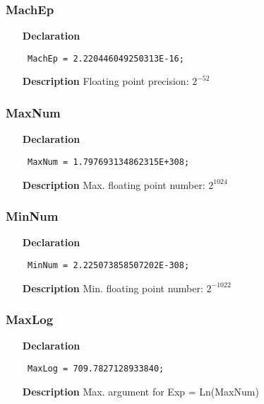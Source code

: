 \documentclass[12pt,a4paper,oneside]{report}
\newcommand{\declarationitem}[1]{\textbf{#1}}
\newcommand{\descriptiontitle}[1]{\textbf{#1}}
\newcommand{\code}[1]{\texttt{#1}}
\begin{document}
\subsubsection{MachEp}
\label{utypes-MachEp}
\begin{itemize}\item[\declarationitem{Declaration}\hfill]
	\begin{flushleft}
		\code{
			MachEp   = 2.220446049250313E-16;}
		
	\end{flushleft}
	
	\par
	\item[\descriptiontitle{Description}]
	Floating point precision: $2^{-52}$
\end{itemize}
\subsubsection{MaxNum}
\label{utypes-MaxNum}
\begin{itemize}\item[\declarationitem{Declaration}\hfill]
	\begin{flushleft}
		\code{
			MaxNum   = 1.797693134862315E+308;}
		
	\end{flushleft}
	
	\par
	\item[\descriptiontitle{Description}]
	Max. floating point number: $2^{1024}$
	
\end{itemize}
\subsubsection{MinNum}
\label{utypes-MinNum}
\begin{itemize}\item[\declarationitem{Declaration}\hfill]
	\begin{flushleft}
		\code{
			MinNum   = 2.225073858507202E-308;}
		
	\end{flushleft}
	
	\par
	\item[\descriptiontitle{Description}]
	Min. floating point number: $2^{-1022}$
	
\end{itemize}
\subsubsection{MaxLog}
\label{utypes-MaxLog}
\begin{itemize}\item[\declarationitem{Declaration}\hfill]
	\begin{flushleft}
		\code{
			MaxLog   = 709.7827128933840;}
		
	\end{flushleft}
\item[\descriptiontitle{Description}]
Max. argument for Exp = Ln(MaxNum)	
\end{itemize}
\end{document}
